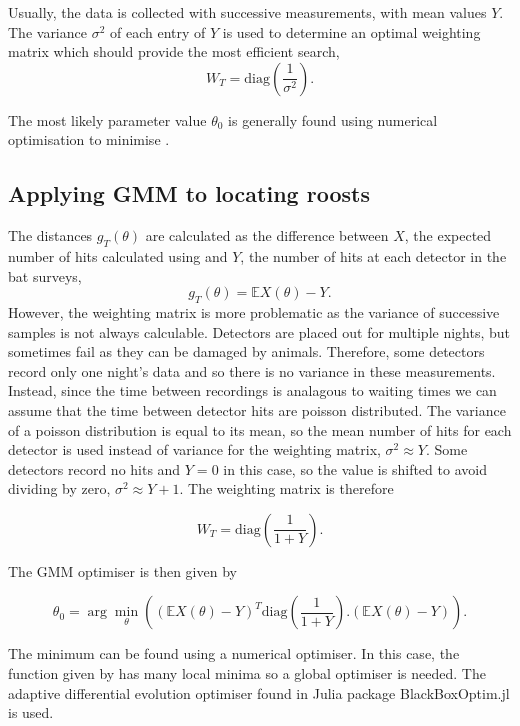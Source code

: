 Usually, the data is collected with successive measurements, with mean values $Y$. The variance $\sigma^2$ of each entry of $Y$ is used to determine an optimal weighting matrix which should provide the most efficient search,
%
\begin{equation}
W_T = \textrm{diag} \left(\frac{1}{\sigma^2} \right) .
\end{equation}

The most likely parameter value $\theta_0$ is generally found using numerical optimisation to minimise .

\subsection{Applying GMM to locating roosts}

The distances $g_T(\theta)$ are calculated as the difference between $X$, the expected number of hits calculated using  and $Y$, the number of hits at each detector in the bat surveys,
%
\begin{equation}
g_T(\theta) = \mathbb{E}X(\theta) - Y .
\end{equation}
%
However, the weighting matrix is more problematic as the variance of successive samples is not always calculable. Detectors are placed out for multiple nights, but sometimes fail as they can be damaged by animals. Therefore, some detectors record only one night's data and so there is no variance in these measurements. Instead, since the time between recordings is analagous to waiting times we can assume that the time between detector hits are poisson distributed. The variance of a poisson distribution is equal to its mean, so the mean number of hits for each detector is used instead of variance for the weighting matrix, $\sigma^2 \approx Y$. Some detectors record no hits and $Y=0$ in this case, so the value is shifted to avoid dividing by zero, $\sigma^2 \approx Y+1$. The weighting matrix is therefore

\begin{equation}
W_T = \textrm{diag} \left(\frac{1}{1+Y} \right) .
\label{eqn:weighting}
\end{equation}

The GMM optimiser is then given by

\begin{equation}
\theta_0 = \arg \min_{\theta} \left( (\mathbb{E}X(\theta) - Y)^T\textrm{diag} \left(\frac{1}{1+Y} \right) .(\mathbb{E}X(\theta) - Y) \right) .
\label{eqn:roost_gmm}
\end{equation}

The minimum can be found using a numerical optimiser. In this case, the function given by  has many local minima so a global optimiser is needed. The adaptive differential evolution optimiser  found in Julia package BlackBoxOptim.jl \cite{Feldt2018} is used.
